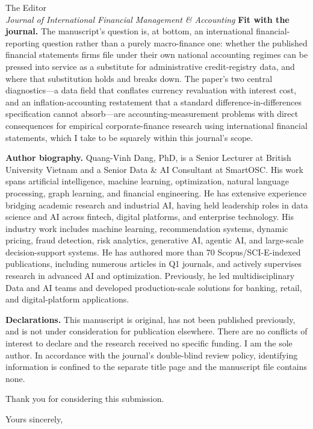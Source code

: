 \documentclass[11pt]{letter}
\begin{document}
\begin{letter}{The Editor\\ \emph{Journal of International
Financial Management \& Accounting}}
\textbf{Fit with the journal.} The manuscript's question is, at bottom, an
international financial-reporting question rather than a purely
macro-finance one: whether the published financial statements firms file
under their own national accounting regimes can be pressed into service as a
substitute for administrative credit-registry data, and where that
substitution holds and breaks down. The paper's two central diagnostics---a
data field that conflates currency revaluation with interest cost, and an
inflation-accounting restatement that a standard difference-in-differences
specification cannot absorb---are accounting-measurement problems with direct
consequences for empirical corporate-finance research using international
financial statements, which I take to be squarely within this journal's
scope.

\textbf{Author biography.} Quang-Vinh Dang, PhD, is a Senior Lecturer at
British University Vietnam and a Senior Data \& AI Consultant at SmartOSC.
His work spans artificial intelligence, machine learning, optimization,
natural language processing, graph learning, and financial engineering. He
has extensive experience bridging academic research and industrial AI,
having held leadership roles in data science and AI across fintech, digital
platforms, and enterprise technology. His industry work includes machine
learning, recommendation systems, dynamic pricing, fraud detection, risk
analytics, generative AI, agentic AI, and large-scale decision-support
systems. He has authored more than 70 Scopus/SCI-E-indexed publications,
including numerous articles in Q1 journals, and actively supervises research
in advanced AI and optimization. Previously, he led multidisciplinary Data
and AI teams and developed production-scale solutions for banking, retail,
and digital-platform applications.

\textbf{Declarations.} This manuscript is original, has not been published
previously, and is not under consideration for publication elsewhere. There
are no conflicts of interest to declare and the research received no specific
funding. I am the sole author. In accordance with the journal's double-blind
review policy, identifying information is confined to the separate title
page and the manuscript file contains none.

Thank you for considering this submission.

\closing{Yours sincerely,}

\end{letter}
\end{document}
